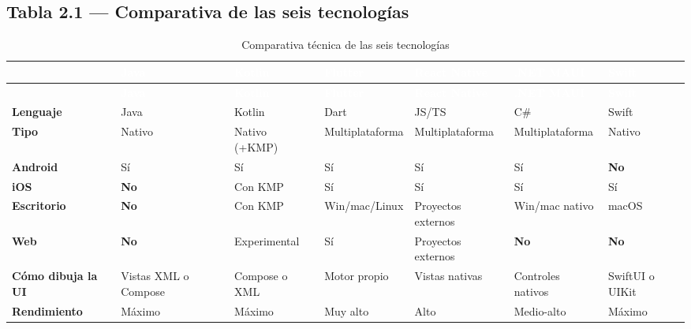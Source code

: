 \subsection*{Tabla 2.1 --- Comparativa de las seis tecnologías}

{\footnotesize
\begin{xltabular}{\textwidth}{@{}>{\RaggedRight\arraybackslash}p{2.5cm} >{\RaggedRight\arraybackslash}X >{\RaggedRight\arraybackslash}X >{\RaggedRight\arraybackslash}X >{\RaggedRight\arraybackslash}X >{\RaggedRight\arraybackslash}X >{\RaggedRight\arraybackslash}X@{}}
\caption{Comparativa técnica de las seis tecnologías}\label{tab:tec-comparativa}\\
\toprule
{}
\textcolor{white}{\sffamily\bfseries} & \textcolor{white}{\sffamily\bfseries Java} & \textcolor{white}{\sffamily\bfseries Kotlin} & \textcolor{white}{\sffamily\bfseries Flutter} & \textcolor{white}{\sffamily\bfseries React Native} & \textcolor{white}{\sffamily\bfseries .NET MAUI} & \textcolor{white}{\sffamily\bfseries Swift} \\
\midrule
\endfirsthead
\toprule
{}
\textcolor{white}{\sffamily\bfseries} & \textcolor{white}{\sffamily\bfseries Java} & \textcolor{white}{\sffamily\bfseries Kotlin} & \textcolor{white}{\sffamily\bfseries Flutter} & \textcolor{white}{\sffamily\bfseries React Native} & \textcolor{white}{\sffamily\bfseries .NET MAUI} & \textcolor{white}{\sffamily\bfseries Swift} \\
\midrule
\endhead
\bottomrule
\endlastfoot
\textbf{Lenguaje} & Java & Kotlin & Dart & JS/TS & C\# & Swift \\
\textbf{Tipo} & Nativo & Nativo (+KMP) & Multiplataforma & Multiplataforma & Multiplataforma & Nativo \\
\textbf{Android} & Sí & Sí & Sí & Sí & Sí & \textbf{No} \\
\textbf{iOS} & \textbf{No} & Con KMP & Sí & Sí & Sí & Sí \\
\textbf{Escritorio} & \textbf{No} & Con KMP & Win/mac/Linux & Proyectos externos & Win/mac nativo & macOS \\
\textbf{Web} & \textbf{No} & Experimental & Sí & Proyectos externos & \textbf{No} & \textbf{No} \\
\textbf{Cómo dibuja la UI} & Vistas XML o Compose & Compose o XML & Motor propio & Vistas nativas & Controles nativos & SwiftUI o UIKit \\
\textbf{Rendimiento} & Máximo & Máximo & Muy alto & Alto & Medio-alto & Máximo \\

\end{xltabular}}
